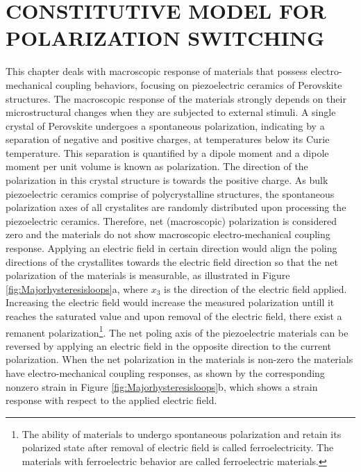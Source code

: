 %
%
%


\chapter{  \uppercase {constitutive model for polarization switching}  } 
\label{section:chap_02_constitutive_model_for_polarization_switching}

This chapter deals with macroscopic response of materials that possess electro-mechanical coupling behaviors,
 focusing on piezoelectric ceramics of Perovskite structures. 
The macroscopic response of the materials strongly depends on their
microstructural changes when they are subjected to external stimuli.
A single crystal of Perovskite undergoes a spontaneous polarization, indicating
by a separation of negative and positive charges, at temperatures below its Curie temperature. 
This separation is quantified by a dipole moment and a dipole moment per unit volume is known as polarization. 
The direction of the polarization in this crystal structure is towards the positive charge. 
As bulk piezoelectric ceramics comprise of polycrystalline structures,
 the spontaneous polarization axes of all crystalites are
 randomly distributed upon processing the piezoelectric ceramics. 
Therefore, net (macroscopic) polarization is considered zero and the materials do not show macroscopic electro-mechanical coupling response. 
Applying an electric field in certain direction would align the poling directions of the crystallites towards the electric field direction so that the net polarization of the materials is measurable,
 as illustrated in Figure \ref{fig:Majorhysteresisloops}a, where $x_3$ is the direction of the electric field applied. 
Increasing the electric field would increase the measured polarization untill it
reaches the saturated value and upon removal of the electric field, there exist a remanent polarization\footnote{The ability of materials to undergo spontaneous polarization and retain its polarized state after removal of electric field is called ferroelectricity.
 The materials with ferroelectric behavior are called ferroelectric materials.}. 
The net poling axis of the piezoelectric materials can be reversed by applying an electric field in the opposite direction to the current polarization. 
When the net polarization in the materials is non-zero the materials have electro-mechanical coupling responses,
 as shown by the corresponding nonzero strain in Figure \ref{fig:Majorhysteresisloops}b, which shows a strain response with respect to the applied electric field.



